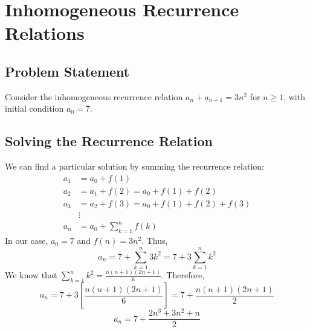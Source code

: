 \documentclass{report}
\begin{document}
\section{Inhomogeneous Recurrence Relations}

\subsection{Problem Statement}

Consider the inhomogeneous recurrence relation $a_n + a_{n-1} = 3n^2$ for $n \geq 1$, with initial condition $a_0 = 7$.

\subsection{Solving the Recurrence Relation}

We can find a particular solution by summing the recurrence relation:
\begin{align*}
	a_1 & = a_0 + f(1)                            \\
	a_2 & = a_1 + f(2) = a_0 + f(1) + f(2)        \\
	a_3 & = a_2 + f(3) = a_0 + f(1) + f(2) + f(3) \\
	    & \vdots                                  \\
	a_n & = a_0 + \sum_{k=1}^{n} f(k)
\end{align*}
In our case, $a_0 = 7$ and $f(n) = 3n^2$. Thus,
$$a_n = 7 + \sum_{k=1}^{n} 3k^2 = 7 + 3\sum_{k=1}^{n} k^2$$
We know that $\sum_{k=1}^{n} k^2 = \frac{n(n+1)(2n+1)}{6}$. Therefore,
$$a_n = 7 + 3\left[\frac{n(n+1)(2n+1)}{6}\right] = 7 + \frac{n(n+1)(2n+1)}{2}$$
$$a_n = 7 + \frac{2n^3 + 3n^2 + n}{2}$$
\end{document}

